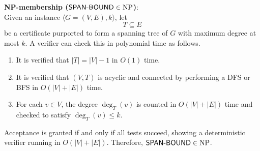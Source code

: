 \begin{enumerate}
\begin{itemize}
\begin{prove}
        \textbf{NP-membership (\(\textsf{SPAN-BOUND}\in\mathrm{NP}\))}:\\
        Given an instance \(\langle G=(V,E),k\rangle\), let 
        \[T\subseteq E\]
        be a certificate purported to form a spanning tree of 
        \(G\) with maximum degree at most \(k\).  A verifier 
        can check this in polynomial time as follows.
        \begin{enumerate}
            \item It is verified that \(\lvert T\rvert = \lvert V\rvert - 1\) in \(O(1)\) time.
            \item It is verified that \((V,T)\) is acyclic and connected by performing a DFS or BFS in \(O(|V|+|E|)\) time.
            \item For each \(v\in V\), the degree \(\deg_T(v)\) is counted in \(O(|V|+|E|)\) time and checked to satisfy \(\deg_T(v)\le k\).
        \end{enumerate}
        Acceptance is granted if and only if all tests succeed, 
        showing a deterministic verifier running in 
        \(O(|V|+|E|)\). Therefore, \(\textsf{SPAN-BOUND}\in\mathrm{NP}\).\\


\end{prove}
\end{itemize}
\end{enumerate}
